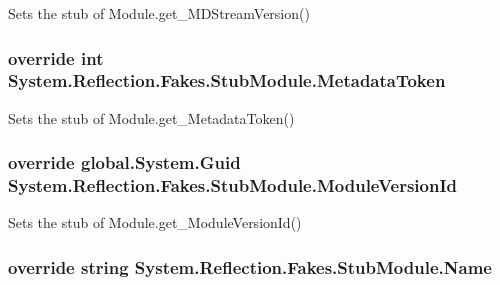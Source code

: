 Sets the stub of Module.\-get\-\_\-\-M\-D\-Stream\-Version()

\hypertarget{class_system_1_1_reflection_1_1_fakes_1_1_stub_module_a67c17026856c2eebba8f8a9c674fac74}{
\subsubsection[{Metadata\-Token}]{\setlength{\rightskip}{0pt plus 5cm}override int System.\-Reflection.\-Fakes.\-Stub\-Module.\-Metadata\-Token\hspace{0.3cm}{\ttfamily [get]}}}\label{class_system_1_1_reflection_1_1_fakes_1_1_stub_module_a67c17026856c2eebba8f8a9c674fac74}


Sets the stub of Module.\-get\-\_\-\-Metadata\-Token()

\hypertarget{class_system_1_1_reflection_1_1_fakes_1_1_stub_module_a929824d7f65f222ebfc55f4ae8ec0aec}{
\subsubsection[{Module\-Version\-Id}]{\setlength{\rightskip}{0pt plus 5cm}override global.\-System.\-Guid System.\-Reflection.\-Fakes.\-Stub\-Module.\-Module\-Version\-Id\hspace{0.3cm}{\ttfamily [get]}}}\label{class_system_1_1_reflection_1_1_fakes_1_1_stub_module_a929824d7f65f222ebfc55f4ae8ec0aec}


Sets the stub of Module.\-get\-\_\-\-Module\-Version\-Id()

\hypertarget{class_system_1_1_reflection_1_1_fakes_1_1_stub_module_a8330e632bfb20fea039f706c3bff0717}{
\subsubsection[{Name}]{\setlength{\rightskip}{0pt plus 5cm}override string System.\-Reflection.\-Fakes.\-Stub\-Module.\-Name\hspace{0.3cm}{\ttfamily [get]}}}\label{class_system_1_1_reflection_1_1_fakes_1_1_stub_module_a8330e632bfb20fea039f706c3bff0717}


